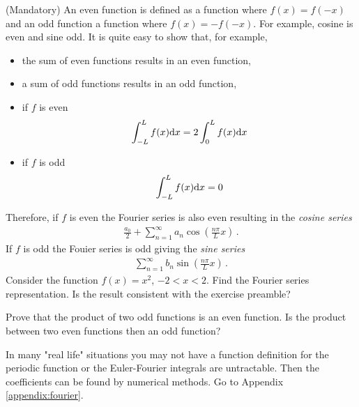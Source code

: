 \begin{exerciseregion}
	\begin{exercise} \label{ex:fourierevenodd}
		(Mandatory) An even function is defined as a function where $f(x) = f(-x)$ and an odd function a function
		where $f(x) = -f(-x)$. For example, cosine is even and sine odd. It is quite easy to show 
		that, for example,  
		\begin{itemize}
			\item the sum of even functions results in an even function,
			\item a sum of odd functions results in an odd function,
			\item if $f$ is even \[ \int_{-L}^L f(x) \mathrm{d} x = 2\int_0^L f(x) \mathrm{d} x\] 
			\item if $f$ is odd \[ \int_{-L}^L f(x) \mathrm{d} x = 0 \] 
		\end{itemize}	
		Therefore, if $f$ is even the Fourier series is also 
		even resulting in the \emph{cosine series} 
		\begin{eqnarray}
			\frac{a_0}{2} + \sum_{n=1}^\infty a_n \cos\left(\frac{n\pi}{L}x\right) \, .
		\end{eqnarray}
		If $f$ is odd the Fouier series is odd giving the \emph{sine series}
		\begin{eqnarray}
			\sum_{n=1}^\infty b_n \sin\left(\frac{n\pi}{L}x\right) \, .
		\end{eqnarray}
		Consider the function $f(x) = x^2$, $-2<x<2$. 
		Find the Fourier series representation. Is the result consistent with the exercise preamble?
	\end{exercise}
	
	\begin{exercise}
		Prove that the product of two odd functions is an even function. Is the product between two 
		even functions then an odd function?
		\end{exercise}

	\begin{exploration}
		In many "real life" situations you may not have a function definition for the 
		periodic function or the Euler-Fourier integrals are untractable. Then the coefficients 
		can be found by numerical methods. Go to Appendix \ref{appendix:fourier}.
	\end{exploration}
\end{exerciseregion}

